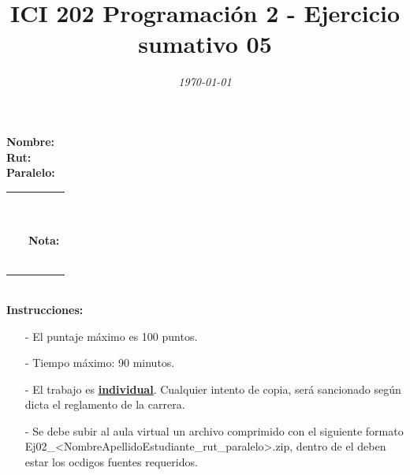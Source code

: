 \documentclass{exam}
\title{\LARGE\color{azul}\textbf{ICI 202 Programaci\'on 2 - Ejercicio sumativo 05 }}
\author{\normalsize \color{gray}{Prof.} \color{black}{\textbf{Ismael Figueroa, Eduardo Godoy}}}
\date{\normalsize \em \today}
\begin{document}

\maketitle

\begin{multicols}{2} \begin{flushleft} \textbf{Nombre:} \\ \vspace*{2mm} \textbf{Rut:} \\ \vspace*{2mm} \textbf{Paralelo:} \end{flushleft} \begin{center} \begin{table}[H] \begin{tabular}{p{4cm}|p{3cm}|} \arrayrulecolor{gray!50}\cline{2-2} ~ & {\em {\scriptsize \color{gray!50}{Puntaje:}}} \\ & ~ \\ ~ & \textbf{Nota:} \\ & ~ \\ \arrayrulecolor{gray!50}\cline{2-2} \end{tabular} \end{table} \end{center} \end{multicols}

\vspace*{-18mm}
\noindent
\textbf{\\Instrucciones:}
\begin{itemize}
    \item[-] El puntaje m\'aximo  es 100 puntos.
    \item[-] Tiempo m\'aximo: 90 minutos.
    \item[-] El trabajo es \underline{\textbf{individual}}. Cualquier intento de copia, ser\'a sancionado seg\'un dicta el reglamento de la carrera.
    \item[-] Se debe subir al aula virtual un archivo comprimido con el siguiente formato \\ Ej02\_<NombreApellidoEstudiante\_rut\_paralelo>.zip, dentro de el deben estar los ocdigos fuentes requeridos.
\end{itemize}
\end{document}
